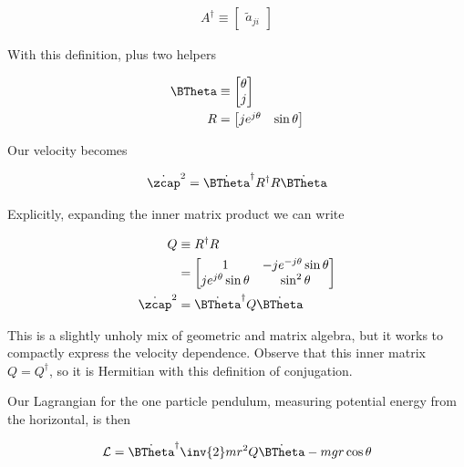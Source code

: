 \begin{align}\label{eqn:sPolarMultiPendulum:zoo6}
A^\dagger \equiv
\begin{bmatrix}
\tilde{a}_{ji}
\end{bmatrix}
\end{align}

With this definition, plus two helpers

\begin{align}\label{eqn:sPolarMultiPendulum:zoo7}
\BTheta &\equiv
\begin{bmatrix}
\theta \\ j
\end{bmatrix} \\
R &= 
\begin{bmatrix}
j e^{j\theta} & \sin\theta
\end{bmatrix}
\end{align}

Our velocity becomes

\begin{align}\label{eqn:sPolarMultiPendulum:zoo8}
{\dot{\zcap}}^2 
&= {\dot{\BTheta}}^\dagger R^\dagger R \dot{\BTheta} \\
\end{align}

Explicitly, expanding the inner matrix product we can write

\begin{align}\label{eqn:sPolarMultiPendulum:zoo9}
Q &\equiv R^\dagger R \\
&=
\begin{bmatrix}
1 & -j e^{-j\theta} \sin\theta \\
j e^{j\theta} \sin\theta & \sin^2 \theta
\end{bmatrix} \\
{\dot{\zcap}}^2 
&= {\dot{\BTheta}}^\dagger Q \dot{\BTheta} \\
\end{align}

This is a slightly unholy mix of geometric and matrix algebra, but it works to compactly express the velocity dependence.  Observe that this inner matrix $Q = Q^\dagger$, so it is Hermitian with this definition of conjugation.

Our Lagrangian for the one particle pendulum, measuring potential energy from the horizontal, is then

\begin{align}\label{eqn:sPolarMultiPendulum:zoo10}
\LL = {\dot{\BTheta}}^\dagger \inv{2} m r^2 Q \dot{\BTheta} - m g r \cos\theta
\end{align}

